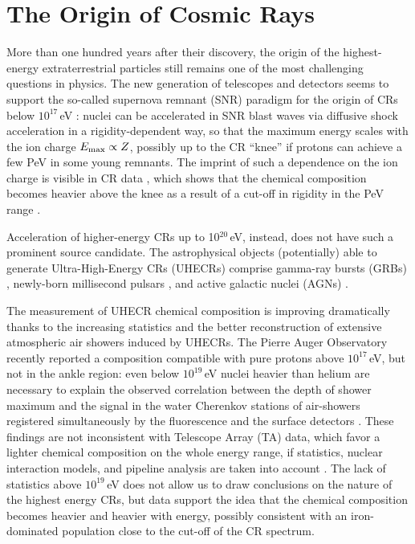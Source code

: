 \documentclass[3p,times,twocolumn]{elsarticle}
\begin{document}

\section{The Origin of Cosmic Rays} 
More than one hundred years after their discovery, the origin of the highest-energy extraterrestrial particles still remains one of the most challenging questions in physics. 
The new generation of telescopes and detectors seems to support the so-called supernova remnant (SNR) paradigm for the origin of CRs below $10^{17}$\,eV \cite[e.g.,][]{tycho}: nuclei can be accelerated in SNR blast waves via diffusive shock acceleration \citep[with efficiency of 10-20\%, see][]{DSA,MFA,diffusion,injection,AZ} in a rigidity-dependent way, so that the maximum energy scales with the ion charge $E_{\rm max}\propto Z$, possibly up to the CR ``knee'' if protons can achieve a few PeV in some young remnants.
The imprint of such a dependence on the ion charge is visible in CR data \cite[e.g.,][]{hoerandel+06,argo12}, which shows that the chemical composition becomes heavier above the knee as a result of a cut-off in rigidity in the PeV range \cite{nuclei,AZ}.

Acceleration of higher-energy CRs up to 10$^{20}$\,eV, instead, does not have such a prominent source candidate.
The astrophysical objects (potentially) able to generate Ultra-High-Energy CRs (UHECRs) comprise gamma-ray bursts (GRBs) \cite[e.g.,][]{waxman95,vietri95}, newly-born millisecond pulsars \cite[e.g.,][]{Blasi+00,Fang+12}, and active galactic nuclei (AGNs) \cite[e.g.,][]{ostrowsky00,Murase+12,espresso}.

The measurement of UHECR chemical composition is improving dramatically thanks to the increasing statistics and the better reconstruction of extensive atmospheric air showers induced by UHECRs.
The Pierre Auger Observatory recently reported a composition compatible with pure protons above $10^{17}$\,eV, but 
not in the ankle region: even below $10^{19}$\,eV nuclei heavier than helium are necessary to explain the observed correlation between the depth of shower maximum and the signal in the water Cherenkov stations of air-showers registered simultaneously by the fluorescence and the surface detectors \citep{Auger14a,Auger16}.
These findings are not inconsistent with Telescope Array (TA) data, which favor a lighter chemical composition on the whole energy range, if statistics, nuclear interaction models, and pipeline analysis are taken into account \citep{Pierog13, PAO-TA15}.
The lack of statistics above  $10^{19}$\,eV does not allow us to draw conclusions on the nature of the highest energy CRs, but data support the idea that the chemical composition becomes heavier and heavier with energy, possibly consistent with an iron-dominated population close to the  cut-off of the CR spectrum.
\end{document}
